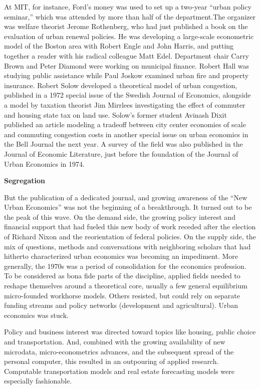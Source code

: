 \documentclass[
]{book}
\begin{document}
At MIT, for instance, Ford's money was used to set up a two-year ``urban policy seminar,'' which was attended by more than half of the department.The organizer was welfare theorist Jerome Rothenberg, who had just published a book on the evaluation of urban renewal policies. He was developing a large-scale econometric model of the Boston area with Robert Engle and John Harris, and putting together a reader with his radical colleague Matt Edel. Department chair Carry Brown and Peter Diamond were working on municipal finance. Robert Hall was studying public assistance while Paul Joskow examined urban fire and property insurance. Robert Solow developed a theoretical model of urban congestion, published in a 1972 special issue of the Swedish Journal of Economics, alongside a model by taxation theorist Jim Mirrlees investigating the effect of commuter and housing state tax on land use. Solow's former student Avinash Dixit published an article modeling a tradeoff between city center economies of scale and commuting congestion costs in another special issue on urban economics in the Bell Journal the next year. A survey of the field was also published in the Journal of Economic Literature, just before the foundation of the Journal of Urban Economics in 1974.

\textbf{Segregation}

But the publication of a dedicated journal, and growing awareness of the ``New Urban Economics'' was not the beginning of a breakthrough. It turned out to be the peak of this wave. On the demand side, the growing policy interest and financial support that had fueled this new body of work receded after the election of Richard Nixon and the reorientation of federal policies. On the supply side, the mix of questions, methods and conversations with neighboring scholars that had hitherto characterized urban economics was becoming an impediment. More generally, the 1970s was a period of consolidation for the economics profession. To be considered as bona fide parts of the discipline, applied fields needed to reshape themselves around a theoretical core, usually a few general equilibrium micro-founded workhorse models.
Others resisted, but could rely on separate funding streams and policy networks (development and agricultural). Urban economics was stuck.

Policy and business interest was directed toward topics like housing, public choice and transportation. And, combined with the growing availability of new microdata, micro-econometrics advances, and the subsequent spread of the personal computer, this resulted in an outpouring of applied research. Computable transportation models and real estate forecasting models were especially fashionable.
\end{document}
